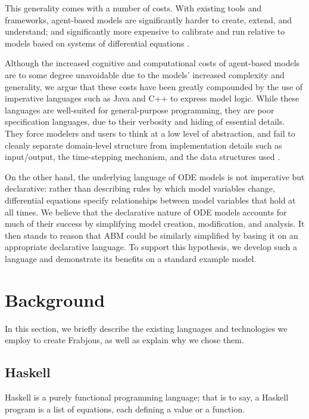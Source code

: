 \documentclass[oribibl]{llncs}
\begin{document}
  This generality comes with a number of costs. With existing tools and frameworks, agent-based models are significantly harder to create, extend, and understand; and significantly more expensive to calibrate and run relative to models based on systems of differential equations \cite{system_dyn_tradeoffs, ab_vs_de}. 
  
  Although the increased cognitive and computational costs of agent-based models are to some degree unavoidable due to the models' increased complexity and generality, we argue that these costs have been greatly compounded by the use of imperative languages such as Java and C++ to express model logic. While these languages are well-suited for general-purpose programming, they are poor specification languages, due to their verbosity and hiding of essential details. They force modelers and users to think at a low level of abstraction, and fail to cleanly separate domain-level structure from implementation details such as input/output, the time-stepping mechanism, and the data structures used \cite{system_dyn_tradeoffs}. 
  
  On the other hand, the underlying language of ODE models is not imperative but declarative: rather than describing rules by which model variables change, differential equations specify relationships between model variables that hold at all times. We believe that the declarative nature of ODE models accounts for much of their success by simplifying model creation, modification, and analysis. It then stands to reason that ABM could be similarly simplified by basing it on an appropriate declarative language. To support this hypothesis, we develop such a language and demonstrate its benefits on a standard example model.
  
\section{Background}

In this section, we briefly describe the existing languages and technologies we employ to create Frabjous, as well as explain why we chose them.

\subsection{Haskell}

  Haskell is a purely functional programming language; that is to say, a Haskell program is a list of equations, each defining a value or a function.
  
\end{document}
